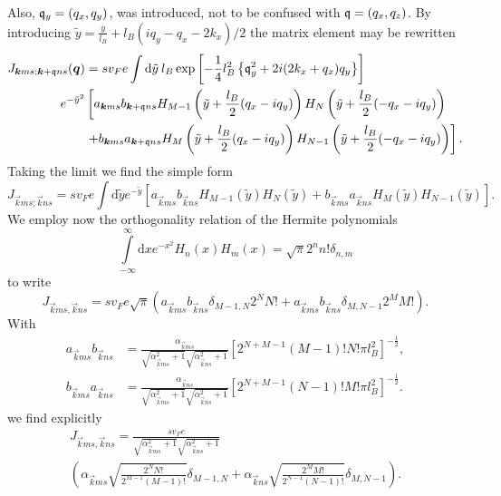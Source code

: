 Also, $\mathfrak{q}_y=(q_x, q_y)$, was introduced, not to be confused with $\mathfrak{q} = (q_x, q_z)$.
By introducing $\tilde{y} = \frac{y}{l_{B}} + l_B(iq_y - q_x - 2 k_x) / 2$ the matrix element may be rewritten
\begin{equation}
  \label{eq:14}
  \begin{split}
    J_{\bm{k}ms; \bm{k}+\mathfrak{q} ns}(\bm{q}) &=
    s v_F e \int \mathrm{d}\tilde{y} \: l_B
\exp \left[- \frac{1}{4} l_B^2 \left\{
    \mathfrak{q}_y^2 + 2 i (2k_x + q_x) q_y 
    \right\}\right]\\
  e^{-\tilde{y}^2}
   &\left[
    a_{\bm{k}ms}b_{\bm{k} + \mathfrak{q} ns}
    H_{M-1} \left( \tilde{y} + \frac{l_B}{2}(q_x - iq_y) \right)
    H_N\left( \tilde{y} + \frac{l_B}{2}(-q_x - iq_y) \right) \right.\\
   &\left. +
    b_{\bm{k}ms} a_{\bm{k} + \mathfrak{q} ns}
    H_M \left( \tilde{y} + \frac{l_B}{2}(q_x - iq_y) \right)
    H_{N-1} \left( \tilde{y} +  \frac{l_B}{2}(-q_x - iq_y)\right)
    \right].
  \end{split}
\end{equation}
Taking the limit we find the simple form
\begin{equation}
  \label{eq:41}
  J_{\vec{k} m s; \vec{k} n s} =
  s v_F e \int \mathrm{d}\tilde{y} e^{-\tilde{y} }
  \left[
    a_{\vec{k}ms} b_{\vec{k} n s} H_{M-1}(\tilde{y} )H_N(\tilde{y} )
    + b_{\vec{k} m s} a _{\vec{k} n s} H_M(\tilde{y} )H_{N-1}(\tilde{y} )
  \right].
\end{equation}
We employ now the orthogonality relation of the Hermite polynomials \cite[Table~18.3.1]{NIST:DLMF}
\begin{equation}
  \label{eq:hermite-ortho}
  \int\limits_{-\infty}^{\infty} \mathrm{d}x e^{-x^2} H_n(x)H_m(x) = \sqrt{\pi} 2^{n} n! \delta_{n,m}
\end{equation}
to write
\begin{equation}
  \label{eq:62}
  J_{\vec{k} m s, \vec{k} n s} = s v_F e \sqrt{\pi} (a_{\vec{k} ms} b_{\vec{k} n s} \delta_{M-1, N} 2^N N! + a_{\vec{k} m s} b_{\vec{k} n s} \delta_{M, N-1} 2^M M!).
\end{equation}
With
\begin{align}
  a_{\vec{k}ms}b_{\vec{k}ns} &= 
  \frac{\alpha_{\vec{k}ms} }{
    \sqrt{\alpha _{\vec{k} ms}^2 +1}
    \sqrt{\alpha _{\vec{k} ns}^2 + 1}
  }
  \left[ 2^{N+M-1} (M-1)! N! \pi l_B^2 \right]^{-\frac{1}{2}},\\
  b_{\vec{k}ms}a_{\vec{k} ns} &= 
  \frac{\alpha_{\vec{k}ns} }{
    \sqrt{\alpha _{\vec{k} ms}^2 +1}
    \sqrt{\alpha _{\vec{k} ns}^2 + 1}
  }
  \left[ 2^{N+M-1} (N-1)! M! \pi l_B^2 \right]^{-\frac{1}{2}}.
\end{align}
we find explicitly
\begin{multline}
  J_{\vec{k} m s, \vec{k} n s} = \frac{s v_F e}{\sqrt{\alpha _{\vec{k} m s}^2 + 1} \sqrt{\alpha _{\vec{k} n s}^2 + 1}}\\
  \left(
    \alpha _{\vec{k} m s}
    \sqrt{\frac{2^{N} N!}{2^{M-1} (M-1)!}} \delta_{M-1, N}
    +
    \alpha _{\vec{k} n s}
    \sqrt{\frac{2^{M} M!}{2^{N-1} (N-1)!}} \delta_{M, N-1}
  \right).
\end{multline}



